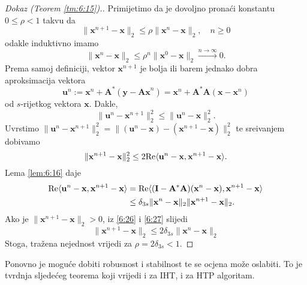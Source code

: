 \documentclass[a4paper,twoside,12pt]{memoir} %
\newcommand{\vect}[1]{\mathbf{#1}}
\renewcommand{\vec}{\vect}
\newcommand{\norm}[1]{\|{#1}\|}
\renewcommand{\Re}{\text{\normalfont{Re}}}
\begin{document}
\begin{proof}[Dokaz (Teorem \ref{tm:6:15}).]
    Primijetimo da je dovoljno prona\'ci konstantu $0 \leq \rho < 1$ takvu da 
    \begin{equation}\label{6:25}
        \norm{\vec x^{n+1} - \vec x}_2 \leq \rho \norm{\vec x^n - \vec x}_2, \quad n \geq 0
    \end{equation}
    odakle induktivno imamo
    \begin{equation*}
        \norm{\vec x^{n} - \vec x}_2 \leq \rho^n \norm{\vec x^0 - \vec x}_2 \xrightarrow{n \rightarrow \infty} 0. 
    \end{equation*}
    Prema samoj definiciji, vektor $\vec x^{n+1}$ je bolja ili barem jednako dobra aproksimacija vektora
    \begin{equation*}
        \vec u^n := \vec x^n + \vec A^*(\vec y - \vec{Ax}^n) = \vec x^n + \vec A^* \vec A (\vec x - \vec x^n) 
    \end{equation*}
    od $s$-rijetkog vektora $\vec x$. Dakle, 
    \begin{equation*}
        \norm{\vec u^n - \vec x^{n+1}}_2^2 \leq \norm{\vec u^n - \vec x}_2^2. 
    \end{equation*}
    Uvrstimo $\norm{\vec u ^n - \vec x^{n+1}}_2^2 = \norm{(\vec u ^n - \vec x) - (\vec x^{n+1} - \vec x)}_2^2$ te sre\dj ivanjem dobivamo
    \begin{equation}\label{6:26}
        \norm{\vec x^{n+1} - \vec x}_2^2 \leq 2 \Re \langle \vec u^n - \vec x, \vec x^{n+1} - \vec x \rangle .
    \end{equation}
    Lema \ref{lem:6:16} daje
    \begin{align}
        \Re \langle \vec u^n - \vec x, \vec x^{n+1} - \vec x \rangle &= \Re \langle (\vec I - \vec A^*\vec A)(\vec x^n - \vec x), \vec x^{n+1} - \vec x \rangle \nonumber \\
                                                                     &\leq \delta_{3s} \norm{\vec x^n - \vec x}_2 \norm{\vec x^{n+1} - \vec x}_2. \label{6:27}
    \end{align}
    Ako je $\norm{\vec x^{n+1} - \vec x}_2 > 0$, iz \eqref{6:26} i \eqref{6:27} slijedi
    \begin{equation*}
        \norm{\vec x^{n+1} - \vec x}_2 \leq 2 \delta_{3s} \norm{\vec x^n - \vec x}_2 
    \end{equation*}
    Stoga, tra\v{z}ena nejednost vrijedi za $ \rho  = 2 \delta_{3s} < 1$.
\end{proof}
Ponovno je mogu\'ce dobiti robusnost i stabilnost te se ocjena mo\v{z}e oslabiti. To je tvrdnja sljede\'ceg teorema koji vrijedi i za IHT, i za HTP algoritam.
\end{document}
